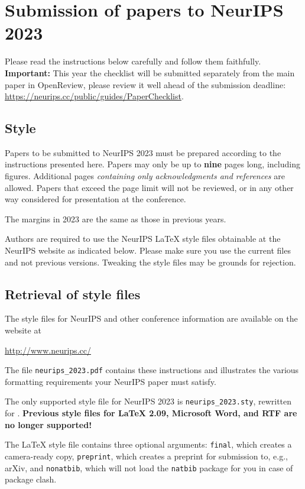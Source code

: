 \documentclass{article}
\begin{document}
\newpage


\section{Submission of papers to NeurIPS 2023}

Please read the instructions below carefully and follow them faithfully. \textbf{Important:} This year the checklist will be submitted separately from the main paper in OpenReview, please review it well ahead of the submission deadline: \url{https://neurips.cc/public/guides/PaperChecklist}.


\subsection{Style}


Papers to be submitted to NeurIPS 2023 must be prepared according to the
instructions presented here. Papers may only be up to {\bf nine} pages long,
including figures. Additional pages \emph{containing only acknowledgments and
references} are allowed. Papers that exceed the page limit will not be
reviewed, or in any other way considered for presentation at the conference.


The margins in 2023 are the same as those in previous years.


Authors are required to use the NeurIPS \LaTeX{} style files obtainable at the
NeurIPS website as indicated below. Please make sure you use the current files
and not previous versions. Tweaking the style files may be grounds for
rejection.


\subsection{Retrieval of style files}


The style files for NeurIPS and other conference information are available on
the website at
\begin{center}
  \url{http://www.neurips.cc/}
\end{center}
The file \verb+neurips_2023.pdf+ contains these instructions and illustrates the
various formatting requirements your NeurIPS paper must satisfy.


The only supported style file for NeurIPS 2023 is \verb+neurips_2023.sty+,
rewritten for \LaTeXe{}.  \textbf{Previous style files for \LaTeX{} 2.09,
  Microsoft Word, and RTF are no longer supported!}


The \LaTeX{} style file contains three optional arguments: \verb+final+, which
creates a camera-ready copy, \verb+preprint+, which creates a preprint for
submission to, e.g., arXiv, and \verb+nonatbib+, which will not load the
\verb+natbib+ package for you in case of package clash.
\end{document}
